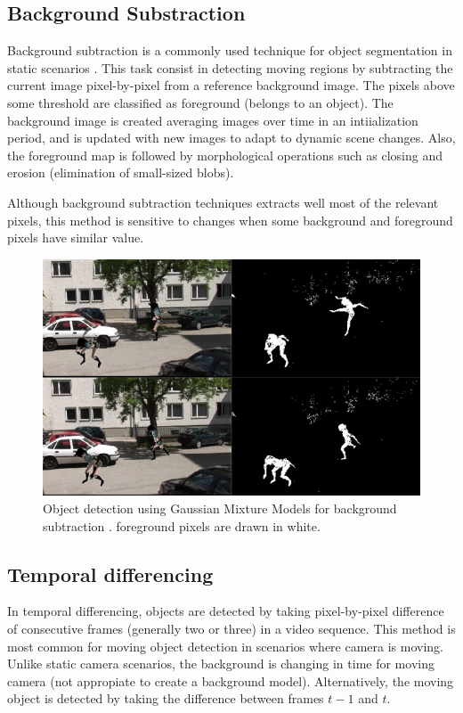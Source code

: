 \subsection{Background Substraction}

Background subtraction is a commonly used technique for object segmentation in static scenarios \cite{McIvor2000}. This task consist in detecting moving regions by subtracting the current image pixel-by-pixel from a reference background image. The pixels above some threshold are classified as foreground (belongs to an object). The background image is created averaging images over time in an intiialization period, and is updated with new images to adapt to dynamic scene changes. Also, the foreground map is followed by morphological operations such as closing and erosion (elimination of small-sized blobs).

Although background subtraction techniques extracts well most of the relevant pixels, this method is sensitive to changes when some background and foreground pixels have similar value.

\begin{figure}[h!]
	\centering
		\includegraphics[width=0.7\linewidth]{Figures/bg_sub.jpg}
	\caption{Object detection using Gaussian Mixture Models for background subtraction \cite{Pham2010}. foreground pixels are drawn in white.}
	\label{fig::bg_sub}
\end{figure}

\subsection{Temporal differencing}

In temporal differencing, objects are detected by taking pixel-by-pixel difference of consecutive frames (generally two or three) in a video sequence. This method is most common for moving object detection in scenarios where camera is moving. Unlike static camera scenarios, the background is changing in time for moving camera (not appropiate to create a background model). Alternatively, the moving object is detected by taking the difference between frames $t - 1$ and $t$.


